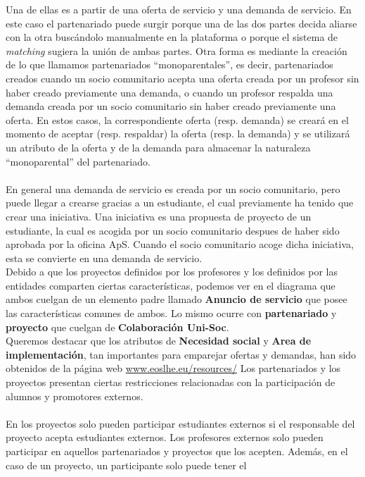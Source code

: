 \documentclass[11pt]{book}
\begin{document}
	Una de ellas es a partir de una oferta de servicio y una demanda de servicio. En este caso el partenariado puede surgir porque una de las dos partes decida aliarse con la otra buscándolo manualmente en la plataforma o porque el sistema de \textit{matching} sugiera la unión de ambas partes.
	Otra forma es mediante la creación de lo que llamamos partenariados ``monoparentales'', es decir, partenariados
	creados cuando un socio comunitario acepta una oferta creada por un
	profesor sin haber creado previamente una demanda, o cuando un profesor
	respalda una demanda creada por un socio comunitario sin haber creado
	previamente una oferta. En estos casos, la correspondiente oferta (resp.
	demanda) se creará en el momento de aceptar (resp. respaldar) la oferta
	(resp. la demanda) y se utilizará un atributo de la oferta y de la
	demanda para almacenar la naturaleza ``monoparental'' del partenariado.\\\\
	En general una demanda de servicio es creada por un socio comunitario, pero puede llegar a crearse gracias a un estudiante, el cual previamente ha tenido que crear una iniciativa. Una iniciativa es una propuesta de proyecto de un estudiante, la cual es acogida por un socio comunitario despues de haber sido aprobada por la oficina ApS. Cuando el socio comunitario acoge dicha iniciativa, esta se convierte en una demanda de servicio.\\
	Debido a que los proyectos definidos por los profesores y los definidos por las entidades comparten ciertas características, podemos ver en el diagrama que ambos cuelgan de un elemento padre llamado \textbf{Anuncio de servicio} que posee las características comunes de ambos.
	Lo mismo ocurre con \textbf{partenariado} y \textbf{proyecto} que cuelgan de \textbf{Colaboración Uni-Soc}.\\
	Queremos destacar que los atributos de \textbf{Necesidad social} y \textbf{Area de implementación}, tan importantes para emparejar ofertas y demandas, han sido obtenidos de la página web \url{www.eoslhe.eu/resources/}
	Los partenariados y los proyectos presentan ciertas restricciones relacionadas con la participación de alumnos y promotores externos.\\\\
	En los proyectos solo pueden participar estudiantes externos si el responsable del proyecto acepta estudiantes externos. 
	Los profesores externos solo pueden participar en aquellos partenariados y proyectos que los acepten. Además, en el caso de un proyecto, un participante solo puede tener el
\end{document}
